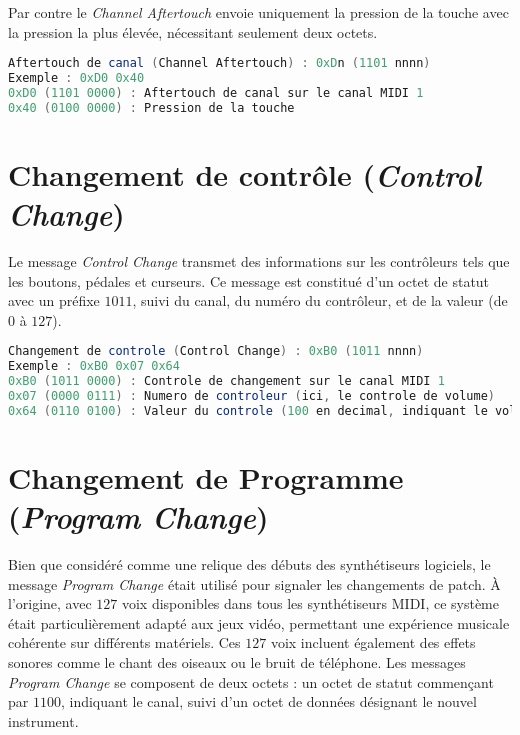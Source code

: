 \documentclass[a4paper]{report}
\begin{document}
Par contre le \textit{Channel Aftertouch} envoie uniquement la pression de la touche avec la pression la plus élevée, nécessitant seulement deux octets.

\begin{minipage}{\linewidth}
\begin{lstlisting}[language=GLSL, caption=\textit{Aftertouch} de canal,captionpos=b,frame=single] 
Aftertouch de canal (Channel Aftertouch) : 0xDn (1101 nnnn)
Exemple : 0xD0 0x40
0xD0 (1101 0000) : Aftertouch de canal sur le canal MIDI 1
0x40 (0100 0000) : Pression de la touche
\end{lstlisting}
\end{minipage}

\section*{Changement de contrôle (\textit{Control Change})}
Le message \textit{Control Change} transmet des informations sur les contrôleurs tels que les boutons, pédales et curseurs. Ce message est constitué d'un octet de statut avec un préfixe $1011$, suivi du canal, du numéro du contrôleur, et de la valeur (de $0$ à $127$).

\begin{minipage}{\linewidth}
\begin{lstlisting}[language=GLSL, caption=Changement de contrôle,captionpos=b,frame=single]
Changement de controle (Control Change) : 0xB0 (1011 nnnn)
Exemple : 0xB0 0x07 0x64
0xB0 (1011 0000) : Controle de changement sur le canal MIDI 1
0x07 (0000 0111) : Numero de controleur (ici, le controle de volume)
0x64 (0110 0100) : Valeur du controle (100 en decimal, indiquant le volume a 100)
\end{lstlisting}
\end{minipage}

\section*{Changement de Programme (\textit{Program Change})}

Bien que considéré comme une relique des débuts des synthétiseurs logiciels, le message \textit{Program Change} était utilisé pour signaler les changements de patch. À l'origine, avec $127$ voix disponibles dans tous les synthétiseurs MIDI, ce système était particulièrement adapté aux jeux vidéo, permettant une expérience musicale cohérente sur différents matériels. Ces $127$ voix incluent également des effets sonores comme le chant des oiseaux ou le bruit de téléphone. Les messages \textit{Program Change} se composent de deux octets : un octet de statut commençant par $1100$, indiquant le canal, suivi d'un octet de données désignant le nouvel instrument.
\end{document}
